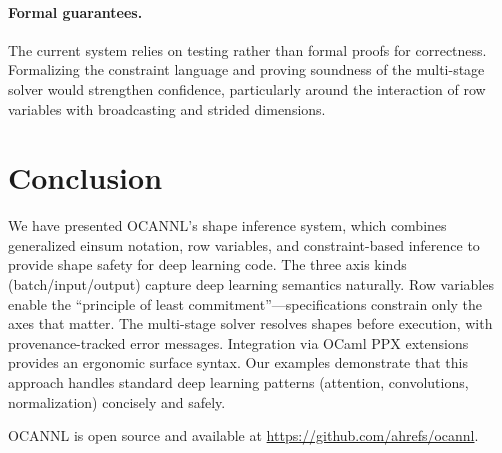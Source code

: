 \documentclass[acmsmall,nonacm,review]{acmart}
\begin{document}
\paragraph{Formal guarantees.}
The current system relies on testing rather than formal proofs for
correctness. Formalizing the constraint language and proving soundness of
the multi-stage solver would strengthen confidence, particularly around the
interaction of row variables with broadcasting and strided dimensions.

\section{Conclusion}
\label{sec:conclusion}

We have presented OCANNL's shape inference system, which combines generalized
einsum notation, row variables, and constraint-based inference to provide
shape safety for deep learning code. The three axis kinds
(batch/input/output) capture deep learning semantics naturally. Row variables
enable the ``principle of least commitment''---specifications constrain only
the axes that matter. The multi-stage solver resolves shapes before execution,
with provenance-tracked error messages. Integration via OCaml PPX extensions
provides an ergonomic surface syntax. Our examples demonstrate that this
approach handles standard deep learning patterns (attention, convolutions,
normalization) concisely and safely.

OCANNL is open source and available at
\url{https://github.com/ahrefs/ocannl}.


\end{document}
